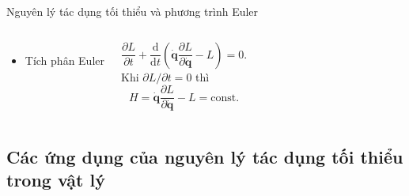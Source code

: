 \begin{frame}{Nguyên lý tác dụng tối thiểu và phương trình Euler}
\begin{columns}
    \begin{itemize}
        \item Tích phân Euler
    \end{itemize}
    \begin{equation}
        \dfrac{\partial L}{\partial t} + \dfrac{\mathrm{d} }{\mathrm{d} t} \left( \dot{\mathbf{q}} \dfrac{\partial L}{\partial \dot{\mathbf{q}}} - L \right) = 0.
    \end{equation}
    Khi \(\partial L/\partial t = 0\) thì
    \begin{equation}
        H = \dot{\mathbf{q}} \dfrac{\partial L}{\partial \dot{\mathbf{q}}} - L = \text{const}.
    \end{equation}
\end{columns}
    
\end{frame}


\subsection{Các ứng dụng của nguyên lý tác dụng tối thiểu trong vật lý}

